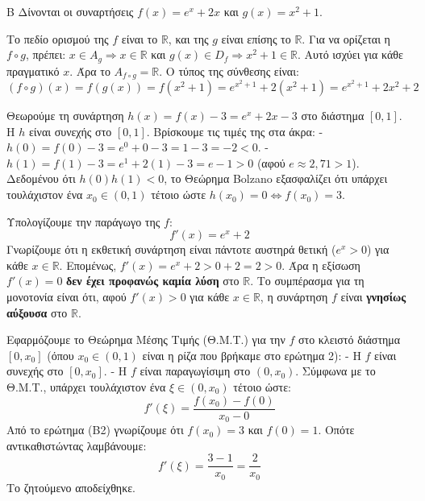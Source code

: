 \begin{thema}{Β}
Δίνονται οι συναρτήσεις $f(x) = e^x + 2x$ και $g(x) = x^2 + 1$.
\begin{erwthma}
\item Το πεδίο ορισμού της $f$ είναι το $\mathbb{R}$, και της $g$ είναι επίσης το $\mathbb{R}$.
Για να ορίζεται η $f \circ g$, πρέπει: $x \in A_g \Rightarrow x \in \mathbb{R}$ και $g(x) \in D_f \Rightarrow x^2+1 \in \mathbb{R}$. 
Αυτό ισχύει για κάθε πραγματικό $x$. Άρα το $A_{f\circ g} = \mathbb{R}$.
Ο τύπος της σύνθεσης είναι:
\[ (f \circ g)(x) = f(g(x)) = f(x^2+1) = e^{x^2+1} + 2(x^2+1) = e^{x^2+1} + 2x^2 + 2 \]

\item Θεωρούμε τη συνάρτηση $h(x) = f(x) - 3 = e^x + 2x - 3$ στο διάστημα $[0, 1]$.
Η $h$ είναι συνεχής στο $[0, 1]$.
Βρίσκουμε τις τιμές της στα άκρα:
- $h(0) = f(0) - 3 = e^0 + 0 - 3 = 1 - 3 = -2 < 0$.
- $h(1) = f(1) - 3 = e^1 + 2(1) - 3 = e - 1 > 0$ (αφού $e \approx 2,71 > 1$).
Δεδομένου ότι $h(0)h(1) < 0$, το Θεώρημα Bolzano εξασφαλίζει ότι υπάρχει τουλάχιστον ένα $x_0 \in (0, 1)$ τέτοιο ώστε $h(x_0) = 0 \Leftrightarrow f(x_0) = 3$.

\item Υπολογίζουμε την παράγωγο της $f$:
\[ f'(x) = e^x + 2 \]
Γνωρίζουμε ότι η εκθετική συνάρτηση είναι πάντοτε αυστηρά θετική ($e^x > 0$) για κάθε $x \in \mathbb{R}$.
Επομένως, $f'(x) = e^x + 2 > 0 + 2 = 2 > 0$. 
Άρα η εξίσωση $f'(x) = 0$ \textbf{δεν έχει προφανώς καμία λύση} στο $\mathbb{R}$.
Το συμπέρασμα για τη μονοτονία είναι ότι, αφού $f'(x) > 0$ για κάθε $x \in \mathbb{R}$, η συνάρτηση $f$ είναι \textbf{γνησίως αύξουσα} στο $\mathbb{R}$.

\item Εφαρμόζουμε το Θεώρημα Μέσης Τιμής (Θ.Μ.Τ.) για την $f$ στο κλειστό διάστημα $[0, x_0]$ (όπου $x_0 \in (0, 1)$ είναι η ρίζα που βρήκαμε στο ερώτημα 2):
- Η $f$ είναι συνεχής στο $[0, x_0]$.
- Η $f$ είναι παραγωγίσιμη στο $(0, x_0)$.
Σύμφωνα με το Θ.Μ.Τ., υπάρχει τουλάχιστον ένα $\xi \in (0, x_0)$ τέτοιο ώστε:
\[ f'(\xi) = \frac{f(x_0) - f(0)}{x_0 - 0} \]
Από το ερώτημα (Β2) γνωρίζουμε ότι $f(x_0) = 3$ και $f(0) = 1$. Οπότε αντικαθιστώντας λαμβάνουμε:
\[ f'(\xi) = \frac{3 - 1}{x_0} = \frac{2}{x_0} \]
Το ζητούμενο αποδείχθηκε.
\end{erwthma}
\end{thema}
